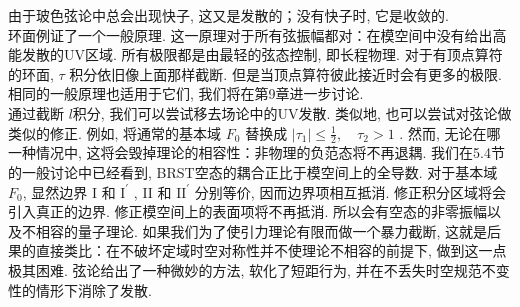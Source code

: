 由于玻色弦论中总会出现快子, 这又是发散的；没有快子时, 它是收敛的.\\
环面例证了一个一般原理. 这一原理对于所有弦振幅都对：在模空间中没有给出高能发散的UV区域. 所有极限都是由最轻的弦态控制, 即长程物理. 对于有顶点算符的环面,  $\tau$ 积分依旧像上面那样截断. 但是当顶点算符彼此接近时会有更多的极限. 相同的一般原理也适用于它们, 我们将在第9章进一步讨论. \\
通过截断 $l$积分, 我们可以尝试移去场论中的UV发散. 类似地, 也可以尝试对弦论做类似的修正. 例如, 将通常的基本域 $F_{0}$ 替换成 $\left|\tau_{1}\right| \leq \frac{1}{2}, \quad \tau_{2}>1$ . 然而, 无论在哪一种情况中, 这将会毁掉理论的相容性：非物理的负范态将不再退耦. 我们在5.4节的一般讨论中已经看到, BRST空态的耦合正比于模空间上的全导数. 对于基本域 $F_{0}$, 显然边界 I 和 $\mathrm{I}^{\prime}$ ,  II 和 $\mathrm{II}^{\prime}$ 分别等价, 因而边界项相互抵消. 修正积分区域将会引入真正的边界. 修正模空间上的表面项将不再抵消. 所以会有空态的非零振幅以及不相容的量子理论. 如果我们为了使引力理论有限而做一个暴力截断, 这就是后果的直接类比：在不破坏定域时空对称性并不使理论不相容的前提下, 做到这一点极其困难. 弦论给出了一种微妙的方法, 软化了短距行为, 并在不丢失时空规范不变性的情形下消除了发散.\\ 

